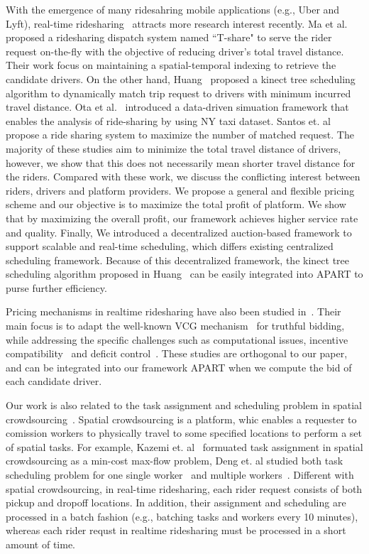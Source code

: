 With the emergence of many ridesahring mobile applications (e.g., Uber and Lyft), real-time ridesharing~\cite{Ma13, Ma15, Huang14,OtaBigdata15, CiciGis15, CaoMDM15, PelzerITS15} attracts more research interest recently. Ma et al.~\cite{Ma13, Ma15} proposed a ridesharing dispatch system named ``T-share" to serve the rider request on-the-fly with the objective of reducing driver's total travel distance. Their work focus on maintaining a spatial-temporal indexing to retrieve the candidate drivers. On the other hand, Huang~\cite{Huang14} proposed a kinect tree scheduling algorithm to dynamically match trip request to drivers with minimum incurred travel distance. Ota et al.~\cite{OtaBigdata15} introduced a data-driven simuation framework that enables the analysis of ride-sharing by using NY taxi dataset. Santos et. al~\cite{SantosIjcai13} propose a ride sharing system to maximize the number of matched request. The majority of these studies aim to minimize the total travel distance of drivers, however, we show that this does not necessarily mean shorter travel distance for the riders. Compared with these work, we discuss the conflicting interest between riders, drivers and platform providers. We propose a general and flexible pricing scheme and  our objective is to maximize the total profit of platform. We show that by maximizing the overall profit, our framework achieves higher service rate and quality.  Finally, We introduced a decentralized auction-based framework to support scalable and real-time scheduling, which differs existing centralized scheduling framework. Because of this decentralized framework, the kinect tree scheduling algorithm proposed in Huang~\cite{Huang14} can be easily integrated into APART to purse further efficiency. 

Pricing mechanisms in realtime ridesharing have also been studied in~\cite{KamarIJCAI09,KleinerIJCAI11, ZhaoAAMAS14}. Their main focus is to adapt the well-known VCG mechanism~\cite{Nisan07} for truthful bidding, while addressing the specific challenges such as computational issues, incentive compatibility~\cite{KamarIJCAI09, KleinerIJCAI11} and deficit control~\cite{ZhaoAAMAS14}. These studies are orthogonal to our paper, and can be integrated into our framework APART when we compute the bid of each candidate driver. 

Our work is also related to the task assignment and scheduling problem in spatial crowdsourcing~\cite{KazemiGis12, DengGis13, DengGis15}. Spatial crowdsourcing is a platform, whic enables a requester to comission workers to physically travel to some specified locations to perform a set of spatial tasks. For example, Kazemi et. al~\cite{KazemiGis12} formuated task assignment in spatial crowdsourcing as a min-cost max-flow problem, Deng et. al studied both task scheduling problem for one single worker~\cite{DengGis13} and multiple workers~\cite{DengGis15}. Different with spatial crowdsourcing, in real-time ridesharing, each rider request consists of both pickup and dropoff locations. In addition, their assignment and scheduling are processed in a batch fashion (e.g., batching tasks and workers every 10 minutes), whereas each rider requst in realtime ridesharing must be processed in a short amount of time.
